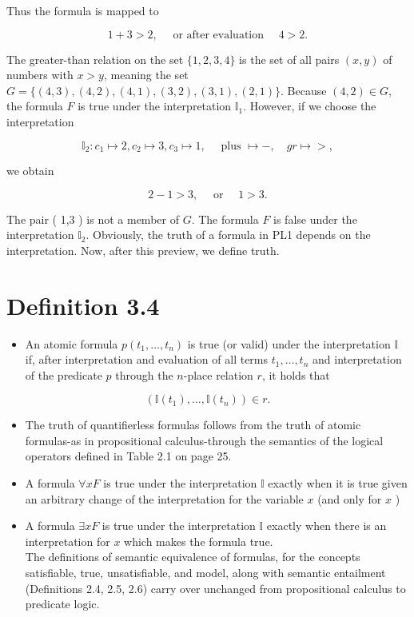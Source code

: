 \documentclass[10pt]{book}
\begin{document}
Thus the formula is mapped to

$$
1+3>2, \quad \text { or after evaluation } \quad 4>2 .
$$

The greater-than relation on the set $\{1,2,3,4\}$ is the set of all pairs $(x, y)$ of numbers with $x>y$, meaning the set $G=\{(4,3),(4,2),(4,1),(3,2),(3,1),(2,1)\}$. Because $(4,2) \in G$, the formula $F$ is true under the interpretation $\mathbb{I}_{1}$. However, if we choose the interpretation

$$
\mathbb{I}_{2}: c_{1} \mapsto 2, c_{2} \mapsto 3, c_{3} \mapsto 1, \quad \text { plus } \mapsto-, \quad g r \mapsto>,
$$

we obtain

$$
2-1>3, \quad \text { or } \quad 1>3 .
$$

The pair ( 1,3 ) is not a member of $G$. The formula $F$ is false under the interpretation $\mathbb{I}_{2}$. Obviously, the truth of a formula in PL1 depends on the interpretation. Now, after this preview, we define truth.

\section*{Definition 3.4}
\begin{itemize}
  \item An atomic formula $p\left(t_{1}, \ldots, t_{n}\right)$ is true (or valid) under the interpretation $\mathbb{I}$ if, after interpretation and evaluation of all terms $t_{1}, \ldots, t_{n}$ and interpretation of the predicate $p$ through the $n$-place relation $r$, it holds that
\end{itemize}


$$
\left(\mathbb{I}\left(t_{1}\right), \ldots, \mathbb{I}\left(t_{n}\right)\right) \in r .
$$

\begin{itemize}
  \item The truth of quantifierless formulas follows from the truth of atomic formulas-as in propositional calculus-through the semantics of the logical operators defined in Table 2.1 on page 25.
  \item A formula $\forall x F$ is true under the interpretation $\mathbb{I}$ exactly when it is true given an arbitrary change of the interpretation for the variable $x$ (and only for $x$ )
  \item A formula $\exists x F$ is true under the interpretation $\mathbb{I}$ exactly when there is an interpretation for $x$ which makes the formula true.\\
The definitions of semantic equivalence of formulas, for the concepts satisfiable, true, unsatisfiable, and model, along with semantic entailment (Definitions 2.4, 2.5, 2.6) carry over unchanged from propositional calculus to predicate logic.
\end{itemize}
\end{document}
